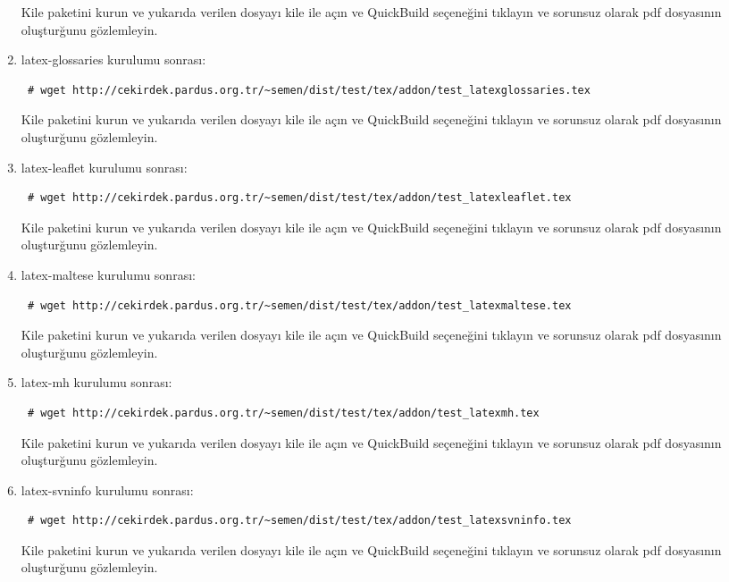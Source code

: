 \documentclass[a4paper,10pt]{article}
\begin{document}
\begin{enumerate}
Kile paketini kurun ve yukarıda verilen dosyayı kile ile açın ve QuickBuild  seçeneğini tıklayın ve sorunsuz olarak pdf dosyasının oluşturğunu gözlemleyin.
\item  latex-glossaries kurulumu sonrası:
\begin{verbatim}
 # wget http://cekirdek.pardus.org.tr/~semen/dist/test/tex/addon/test_latexglossaries.tex
\end{verbatim}

Kile paketini kurun ve yukarıda verilen dosyayı kile ile açın ve QuickBuild  seçeneğini tıklayın ve sorunsuz olarak pdf dosyasının oluşturğunu gözlemleyin.
\item  latex-leaflet kurulumu sonrası:
\begin{verbatim}
 # wget http://cekirdek.pardus.org.tr/~semen/dist/test/tex/addon/test_latexleaflet.tex
\end{verbatim}

Kile paketini kurun ve yukarıda verilen dosyayı kile ile açın ve QuickBuild  seçeneğini tıklayın ve sorunsuz olarak pdf dosyasının oluşturğunu gözlemleyin.
\item  latex-maltese kurulumu sonrası:
\begin{verbatim}
 # wget http://cekirdek.pardus.org.tr/~semen/dist/test/tex/addon/test_latexmaltese.tex
\end{verbatim}

Kile paketini kurun ve yukarıda verilen dosyayı kile ile açın ve QuickBuild  seçeneğini tıklayın ve sorunsuz olarak pdf dosyasının oluşturğunu gözlemleyin.

\item  latex-mh kurulumu sonrası:
\begin{verbatim}
 # wget http://cekirdek.pardus.org.tr/~semen/dist/test/tex/addon/test_latexmh.tex
\end{verbatim}

Kile paketini kurun ve yukarıda verilen dosyayı kile ile açın ve QuickBuild  seçeneğini tıklayın ve sorunsuz olarak pdf dosyasının oluşturğunu gözlemleyin.
\item  latex-svninfo kurulumu sonrası:
\begin{verbatim}
 # wget http://cekirdek.pardus.org.tr/~semen/dist/test/tex/addon/test_latexsvninfo.tex
\end{verbatim}

Kile paketini kurun ve yukarıda verilen dosyayı kile ile açın ve QuickBuild  seçeneğini tıklayın ve sorunsuz olarak pdf dosyasının oluşturğunu gözlemleyin.


\end{enumerate}
\end{document}
